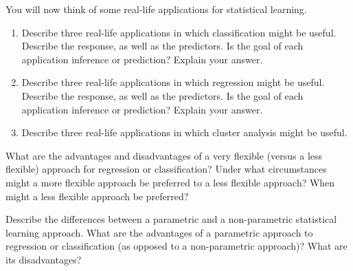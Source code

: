 \documentclass[12pt]{report}
\begin{document}
\begin{exercise}
You will now think of some real-life applications for statistical learning.
\begin{enumerate}
    \item[(a)] Describe three real-life applications in which classification might be useful. Describe the response, as well as the predictors. Is the goal of each application inference or prediction? Explain your answer.
    \item[(b)] Describe three real-life applications in which regression might be useful. Describe the response, as well as the predictors. Is the goal of each application inference or prediction? Explain your answer.
    \item[(c)] Describe three real-life applications in which cluster analysis might be useful.
\end{enumerate}
\end{exercise}

\begin{exercise}
What are the advantages and disadvantages of a very flexible (versus a less flexible) approach for regression or classification? Under what circumstances might a more flexible approach be preferred to a less flexible approach? When might a less flexible approach be preferred?
\end{exercise}

\begin{exercise}
Describe the differences between a parametric and a non-parametric statistical learning approach. What are the advantages of a parametric approach to regression or classification (as opposed to a non-parametric approach)? What are its disadvantages?
\end{exercise}
\end{document}

